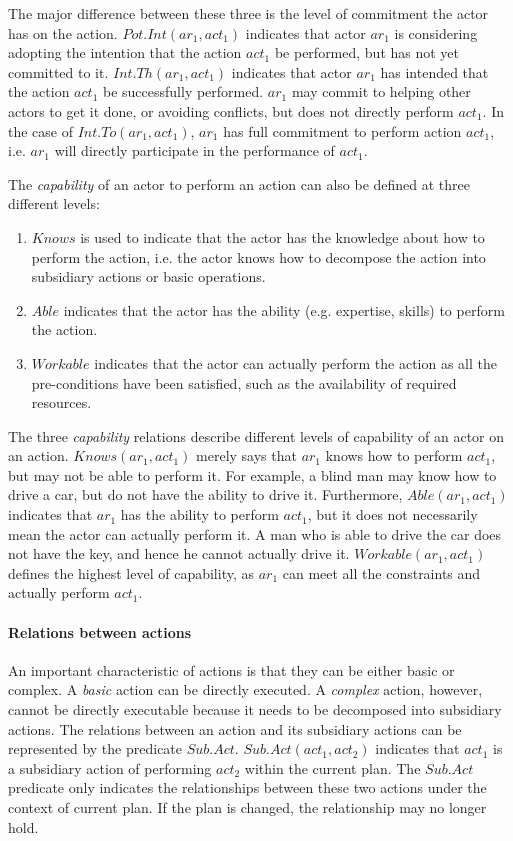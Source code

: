  The major difference between these three is the level of commitment the actor has on the action. $Pot.Int(ar_1, act_1)$ indicates that actor $ar_1$ is considering adopting the intention that the action $act_1$ be performed, but has not yet committed to it. $Int.Th(ar_1, act_1)$ indicates that actor $ar_1$ has intended that the action $act_1$ be successfully performed. $ar_1$ may commit to helping other actors to get it done, or avoiding conflicts, but does not directly perform $act_1$. In the case of $Int.To(ar_1, act_1)$, $ar_1$ has full commitment to perform action $act_1$, i.e. $ar_1$ will directly participate in the performance of  $act_1$.

The \emph{capability} of an actor to perform an action can also be defined at three different levels:

\begin{enumerate}
	\item $Knows$ is used to indicate that the actor has the knowledge about how to perform the action, i.e. the actor knows how to decompose the action into subsidiary actions or basic operations.
	\item $Able$ indicates that the actor has the ability (e.g. expertise, skills) to perform the action.
	\item $Workable$ indicates that the actor can actually perform the action as all the pre-conditions have been satisfied, such as the availability of required resources.
\end{enumerate}

The three \emph{capability} relations describe different levels of capability of an actor on an action. $Knows(ar_1, act_1)$ merely says that $ar_1$ knows how to perform $act_1$, but may not be able to perform it. For example, a blind man may know how to drive a car, but do not have the ability to drive it. Furthermore, $Able(ar_1, act_1)$ indicates that $ar_1$ has the ability to perform $act_1$, but it does not necessarily mean the actor can actually perform it. A man who is able to drive the car does not have the key, and hence he cannot actually drive it. $Workable(ar_1, act_1)$ defines the highest level of capability, as $ar_1$ can meet all the constraints and actually perform $act_1$.

\paragraph*{Relations between actions} %
\label{par:relations_between_actions}
An important characteristic of actions is that they can be either basic or complex. A \emph{basic} action can be directly executed. A \emph{complex} action, however, cannot be directly executable because it needs to be decomposed into subsidiary actions. The relations between an action and its subsidiary actions can be represented by the predicate $Sub.Act$. $Sub.Act(act_1, act_2)$ indicates that $act_1$ is a subsidiary action of performing $act_2$ within the current plan. The $Sub.Act$ predicate only indicates the relationships between these two actions under the context of current plan. If the plan is changed, the relationship may no longer hold.

